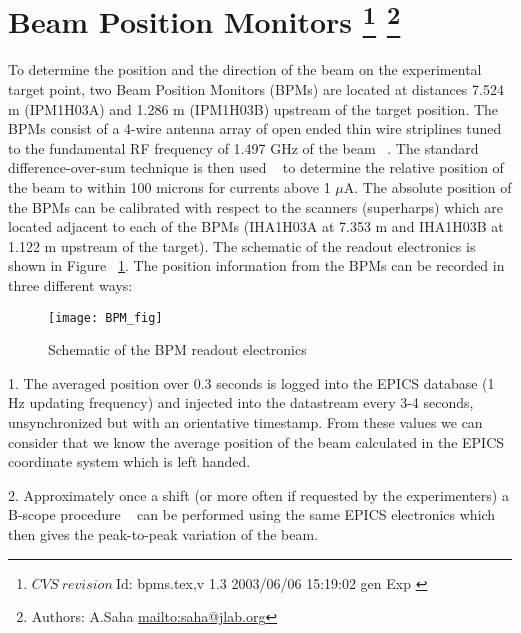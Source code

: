 \section[Beam Position Monitors]{Beam Position Monitors
\footnote{
  $CVS~revision~ $Id: bpms.tex,v 1.3 2003/06/06 15:19:02 gen Exp $ $
}
\footnote{Authors: A.Saha \url{mailto:saha@jlab.org}}
}

To determine the position and the direction of the beam on the experimental 
target point, two Beam Position Monitors (BPMs) are located at distances 7.524 m 
(IPM1H03A) and 1.286 m (IPM1H03B) upstream of the target position. 
The BPMs consist of a 4-wire antenna array of open ended thin wire striplines 
tuned to the fundamental RF frequency of 1.497 GHz of the beam ~\cite{bi:bar90}. The 
standard difference-over-sum technique is then used ~\cite{bi:HW} to determine the 
relative position of the beam to within 100 microns for currents
above 1 $\mu $A. The absolute  position of the BPMs can be calibrated with respect to the 
scanners (superharps) which are located adjacent to each of the BPMs (IHA1H03A 
at 7.353 m and IHA1H03B at 1.122 m upstream of the target). The schematic of the 
readout electronics is shown in Figure ~\ref{fig:bpmel}. The
position information from the 
BPMs can be recorded in three different ways:

\begin{figure}
\begin{center}
\texttt{[image: BPM\_fig]}
{\linespread{1.}
\caption[Beamline: BPM Readout Electronics]{Schematic of the BPM readout
electronics}
\label{fig:bpmel}}
\end{center}
\end{figure}

\vskip 0.5cm

1. The averaged position over 0.3 seconds is logged into the EPICS database (1 
Hz updating frequency) and injected into the datastream every 3-4 seconds, 
unsynchronized but with an orientative timestamp. From these values we can 
consider that we know the average position of the beam calculated in the EPICS 
coordinate system which is left handed.

\vskip 0.5cm

2. Approximately once a shift (or more often if requested by the experimenters) 
a B-scope procedure ~\cite{bi:TP} can be performed using the same EPICS electronics 
which then gives the peak-to-peak variation of the beam.

\vskip 0.5cm

